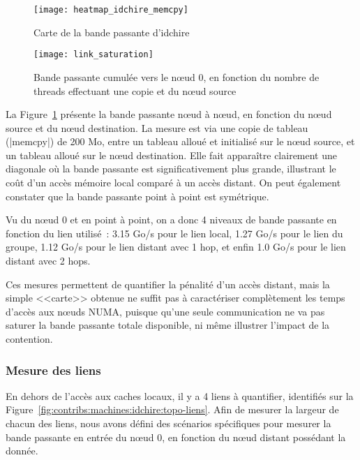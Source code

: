\begin{figure}[t!]
  \centering
  \texttt{[image: heatmap\_idchire\_memcpy]}
  \caption{Carte de la bande passante d'idchire}\label{fig:contribs:machines:idchire:heatmap}
\end{figure}

\begin{figure}[h!]
  \centering
  \texttt{[image: link\_saturation]}
  \caption{Bande passante cumulée vers le nœud 0, en fonction du nombre de threads effectuant une copie et du nœud source}\label{fig:contribs:machines:idchire:saturation}
\end{figure}


La Figure~\ref{fig:contribs:machines:idchire:heatmap} présente la bande passante nœud à nœud, en fonction du nœud source et du nœud destination.
La mesure est via une copie de tableau (|memcpy|) de 200 Mo, entre un tableau alloué et initialisé sur le nœud source, et un tableau alloué sur le nœud destination.
Elle fait apparaître clairement une diagonale où la bande passante est significativement plus grande, illustrant le coût d'un accès mémoire local comparé à un accès distant.
On peut également constater que la bande passante point à point est symétrique.

Vu du nœud 0 et en point à point, on a donc 4 niveaux de bande passante en fonction du lien utilisé~: 3.15 Go/s pour le lien local, 1.27 Go/s pour le lien du groupe, 1.12 Go/s pour le lien distant avec 1 hop, et enfin 1.0 Go/s pour le lien distant avec 2 hops.

Ces mesures permettent de quantifier la pénalité d'un accès distant, mais la simple <<carte>> obtenue ne suffit pas à caractériser complètement les temps d'accès aux nœuds NUMA, puisque qu'une seule communication ne va pas saturer la bande passante totale disponible, ni même illustrer l'impact de la contention.


\subsubsection{Mesure des liens}\label{sec:contribs:machines:idchire:liens}

En dehors de l'accès aux caches locaux, il y a 4 liens à quantifier, identifiés sur la Figure~\ref{fig:contribs:machines:idchire:topo-liens}.
Afin de mesurer la largeur de chacun des liens, nous avons défini des scénarios spécifiques pour mesurer la bande passante en entrée du nœud 0, en fonction du nœud distant possédant la donnée.

